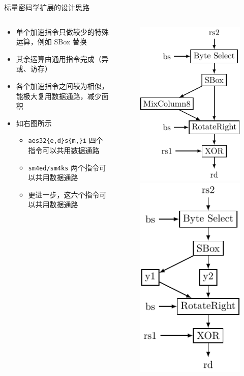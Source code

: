\documentclass[aspectratio=169]{ctexbeamer}
\begin{document}
\begin{frame}{标量密码学扩展的设计思路}
  \begin{columns}
    \begin{column}{0.5\textwidth}
      \begin{itemize}
        \item 单个加速指令只做较少的特殊运算，例如 SBox 替换
        \item 其余运算由通用指令完成（异或、访存）
        \item 各个加速指令之间较为相似，能极大复用数据通路，减少面积
        \item<2-> 如右图所示\begin{itemize}
          \item \texttt{aes32\{e,d\}s\{m,\}i} 四个指令可以共用数据通路
          \item \texttt{sm4ed/sm4ks} 两个指令可以共用数据通路
          \item 更进一步，这六个指令可以共用数据通路
        \end{itemize}
      \end{itemize}
    \end{column}
    \begin{column}{0.5\textwidth}
      \begin{figure}
        \centering
        {\includegraphics[width=0.45\linewidth]{img/aes32.pdf}}
        {\includegraphics[width=0.35\linewidth]{img/sm4.pdf}}

\end{figure}
\end{column}
\end{columns}
\end{frame}
\end{document}
